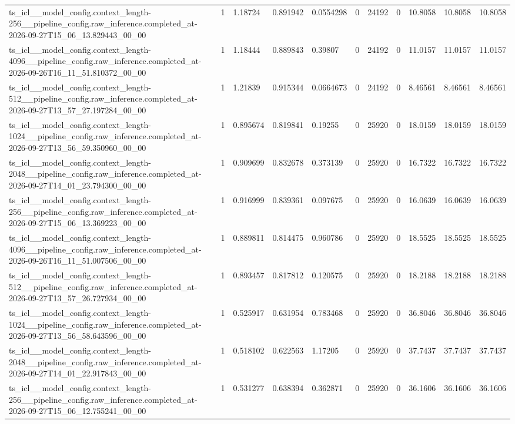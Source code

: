 \begin{tabular}{lllllllllll}
ts\_icl\_\_model\_config.context\_length-256\_\_pipeline\_config.raw\_inference.completed\_at-2026-09-27T15\_06\_13.829443\_00\_00 & 1 & 1.18724 & 0.891942 & 0.0554298 & 0 & 24192 & 0 & 10.8058 & 10.8058 & 10.8058 \\
ts\_icl\_\_model\_config.context\_length-4096\_\_pipeline\_config.raw\_inference.completed\_at-2026-09-26T16\_11\_51.810372\_00\_00 & 1 & 1.18444 & 0.889843 & 0.39807 & 0 & 24192 & 0 & 11.0157 & 11.0157 & 11.0157 \\
ts\_icl\_\_model\_config.context\_length-512\_\_pipeline\_config.raw\_inference.completed\_at-2026-09-27T13\_57\_27.197284\_00\_00 & 1 & 1.21839 & 0.915344 & 0.0664673 & 0 & 24192 & 0 & 8.46561 & 8.46561 & 8.46561 \\
ts\_icl\_\_model\_config.context\_length-1024\_\_pipeline\_config.raw\_inference.completed\_at-2026-09-27T13\_56\_59.350960\_00\_00 & 1 & 0.895674 & 0.819841 & 0.19255 & 0 & 25920 & 0 & 18.0159 & 18.0159 & 18.0159 \\
ts\_icl\_\_model\_config.context\_length-2048\_\_pipeline\_config.raw\_inference.completed\_at-2026-09-27T14\_01\_23.794300\_00\_00 & 1 & 0.909699 & 0.832678 & 0.373139 & 0 & 25920 & 0 & 16.7322 & 16.7322 & 16.7322 \\
ts\_icl\_\_model\_config.context\_length-256\_\_pipeline\_config.raw\_inference.completed\_at-2026-09-27T15\_06\_13.369223\_00\_00 & 1 & 0.916999 & 0.839361 & 0.097675 & 0 & 25920 & 0 & 16.0639 & 16.0639 & 16.0639 \\
ts\_icl\_\_model\_config.context\_length-4096\_\_pipeline\_config.raw\_inference.completed\_at-2026-09-26T16\_11\_51.007506\_00\_00 & 1 & 0.889811 & 0.814475 & 0.960786 & 0 & 25920 & 0 & 18.5525 & 18.5525 & 18.5525 \\
ts\_icl\_\_model\_config.context\_length-512\_\_pipeline\_config.raw\_inference.completed\_at-2026-09-27T13\_57\_26.727934\_00\_00 & 1 & 0.893457 & 0.817812 & 0.120575 & 0 & 25920 & 0 & 18.2188 & 18.2188 & 18.2188 \\
ts\_icl\_\_model\_config.context\_length-1024\_\_pipeline\_config.raw\_inference.completed\_at-2026-09-27T13\_56\_58.643596\_00\_00 & 1 & 0.525917 & 0.631954 & 0.783468 & 0 & 25920 & 0 & 36.8046 & 36.8046 & 36.8046 \\
ts\_icl\_\_model\_config.context\_length-2048\_\_pipeline\_config.raw\_inference.completed\_at-2026-09-27T14\_01\_22.917843\_00\_00 & 1 & 0.518102 & 0.622563 & 1.17205 & 0 & 25920 & 0 & 37.7437 & 37.7437 & 37.7437 \\
ts\_icl\_\_model\_config.context\_length-256\_\_pipeline\_config.raw\_inference.completed\_at-2026-09-27T15\_06\_12.755241\_00\_00 & 1 & 0.531277 & 0.638394 & 0.362871 & 0 & 25920 & 0 & 36.1606 & 36.1606 & 36.1606 \\

\end{tabular}
